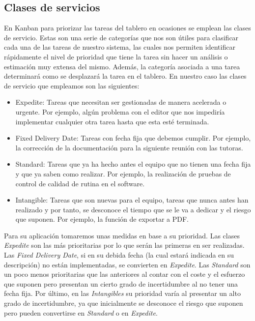 \subsection{Clases de servicios}
\label{claseDeServicio}
En Kanban para priorizar las tareas del tablero en ocasiones se emplean las clases de servicio. Estas son una serie de categorías que nos son útiles para clasificar cada una de las tareas de nuestro sistema, las cuales nos permiten identificar rápidamente el nivel de prioridad que tiene la tarea sin hacer un análisis o estimación muy extensa del mismo. Además, la categoría asociada a una tarea determinará como se desplazará la tarea en el tablero. En nuestro caso las clases de servicio que empleamos son las siguientes:
\begin{itemize}
  \item Expedite: Tareas que necesitan ser gestionadas de manera acelerada o urgente. Por ejemplo, algún problema con el editor que nos impediría implementar cualquier otra tarea hasta que esta esté terminada.
  \item Fixed Delivery Date: Tareas con fecha fija que debemos cumplir. Por ejemplo, la corrección de la documentación para la siguiente reunión con las tutoras.
  \item Standard: Tareas que ya ha hecho antes el equipo que no tienen una fecha fija y que ya saben como realizar. Por ejemplo, la realización de pruebas de control de calidad de rutina en el software.
  \item Intangible: Tareas que son nuevas para el equipo, tareas que nunca antes han realizado y por tanto, se desconoce el tiempo que se le va a dedicar y el riesgo que suponen. Por ejemplo, la función de exportar a PDF.
\end{itemize}

Para su aplicación tomaremos unas medidas en base a su prioridad. Las clases \textit{Expedite} son las más prioritarias por lo que serán las primeras en ser realizadas. Las \textit{Fixed Delivery Date}, si en su debida fecha (la cual estará indicada en su descripción) no están implementadas, se convierten en \textit{Expedite}. Las \textit{Standard} son un poco menos prioritarias que las anteriores al contar con el coste y el esfuerzo que suponen pero presentan un cierto grado de incertidumbre al no tener una fecha fija. Por último, en las \textit{Intangibles} su prioridad varía al presentar un alto grado de incertidumbre, ya que inicialmente se desconoce el riesgo que suponen pero pueden convertirse en \textit{Standard} o en \textit{Expedite}.

